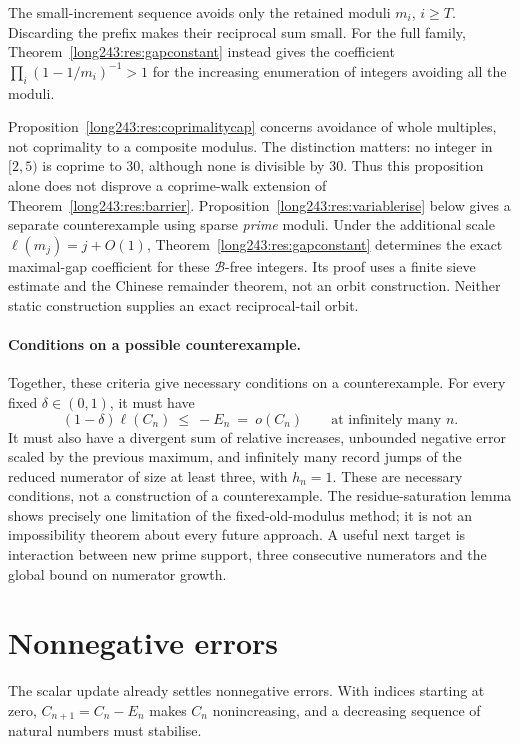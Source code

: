 The small-increment sequence avoids only the retained moduli $m_i$,
$i\ge T$. Discarding the prefix makes their reciprocal sum small.
For the full family, Theorem~\ref{long243:res:gapconstant} instead gives
the coefficient $\prod_i(1-1/m_i)^{-1}>1$ for the increasing enumeration
of integers avoiding all the moduli.


Proposition~\ref{long243:res:coprimalitycap} concerns avoidance of whole
multiples, not coprimality to a composite modulus. The distinction matters:
no integer in $[2,5)$ is coprime to $30$, although none is divisible by $30$.
Thus this proposition alone does not disprove a coprime-walk extension of
Theorem~\ref{long243:res:barrier}. Proposition~\ref{long243:res:variablerise}
below gives a separate counterexample using sparse \emph{prime} moduli.
Under the additional scale $\ell(m_j)=j+O(1)$,
Theorem~\ref{long243:res:gapconstant} determines the exact maximal-gap
coefficient for these $\mathcal B$-free integers. Its proof uses a finite
sieve estimate and the Chinese remainder theorem, not an orbit
construction. Neither static construction supplies an exact
reciprocal-tail orbit.

\paragraph{Conditions on a possible counterexample.}
Together, these criteria give necessary conditions on a counterexample.
For every fixed $\delta\in(0,1)$, it must have
\[
 (1-\delta)\ell(C_n)\ \le\ -E_n\ =\ o(C_n)
 \qquad\text{at infinitely many }n.
\]
It must also have a divergent sum of relative increases, unbounded
negative error scaled by the previous maximum, and infinitely many record
jumps of the reduced numerator of size at least three, with $h_n=1$.
These are necessary conditions, not a construction of a counterexample. The residue-saturation lemma
shows precisely one limitation of the fixed-old-modulus method; it is not
an impossibility theorem about every future approach. A useful next target
is interaction between new prime support, three consecutive numerators and
the global bound on numerator growth.

\section{Nonnegative errors}\label{long243:sec:descent}

The scalar update already settles nonnegative errors. With indices
starting at zero, $C_{n+1}=C_n-E_n$ makes $C_n$ nonincreasing, and
a decreasing sequence of natural numbers must stabilise.


